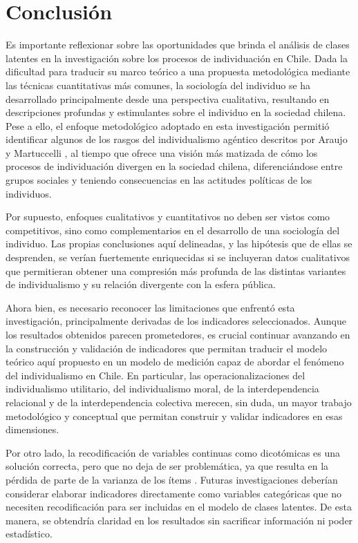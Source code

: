 \documentclass[12pt,oneside]{templates/facsothesis}
\begin{document}
\hypertarget{conclusiuxf3n}{%
\chapter*{Conclusión}\label{conclusiuxf3n}}

Es importante reflexionar sobre las oportunidades que brinda el análisis de clases latentes en la investigación sobre los procesos de individuación en Chile. Dada la dificultad para traducir su marco teórico a una propuesta metodológica mediante las técnicas cuantitativas más comunes, la sociología del individuo se ha desarrollado principalmente desde una perspectiva cualitativa, resultando en descripciones profundas y estimulantes sobre el individuo en la sociedad chilena. Pese a ello, el enfoque metodológico adoptado en esta investigación permitió identificar algunos de los rasgos del individualismo agéntico descritos por Araujo y Martuccelli \citeyearpar{araujo2014}, al tiempo que ofrece una visión más matizada de cómo los procesos de individuación divergen en la sociedad chilena, diferenciándose entre grupos sociales y teniendo consecuencias en las actitudes políticas de los individuos.

Por supuesto, enfoques cualitativos y cuantitativos no deben ser vistos como competitivos, sino como complementarios en el desarrollo de una sociología del individuo. Las propias conclusiones aquí delineadas, y las hipótesis que de ellas se desprenden, se verían fuertemente enriquecidas si se incluyeran datos cualitativos que permitieran obtener una compresión más profunda de las distintas variantes de individualismo y su relación divergente con la esfera pública.

Ahora bien, es necesario reconocer las limitaciones que enfrentó esta investigación, principalmente derivadas de los indicadores seleccionados. Aunque los resultados obtenidos parecen prometedores, es crucial continuar avanzando en la construcción y validación de indicadores que permitan traducir el modelo teórico aquí propuesto en un modelo de medición capaz de abordar el fenómeno del individualismo en Chile. En particular, las operacionalizaciones del individualismo utilitario, del individualismo moral, de la interdependencia relacional y de la interdependencia colectiva merecen, sin duda, un mayor trabajo metodológico y conceptual que permitan construir y validar indicadores en esas dimensiones.

Por otro lado, la recodificación de variables continuas como dicotómicas es una solución correcta, pero que no deja de ser problemática, ya que resulta en la pérdida de parte de la varianza de los ítems \citep{fernandes2019}. Futuras investigaciones deberían considerar elaborar indicadores directamente como variables categóricas que no necesiten recodificación para ser incluidas en el modelo de clases latentes. De esta manera, se obtendría claridad en los resultados sin sacrificar información ni poder estadístico.
\end{document}

